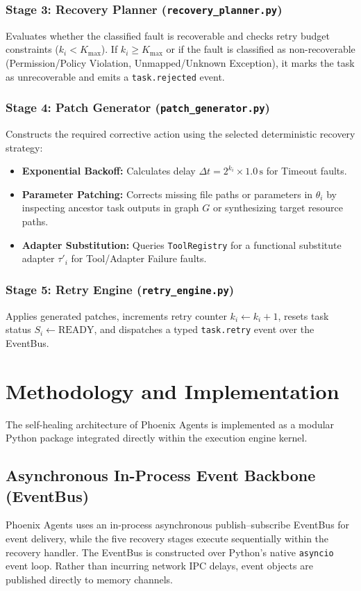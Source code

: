 \documentclass[conference]{IEEEtran}
\begin{document}
\subsubsection{Stage 3: Recovery Planner (\texttt{recovery\_planner.py})}
Evaluates whether the classified fault is recoverable and checks retry budget constraints ($k_i < K_{\text{max}}$). If $k_i \ge K_{\text{max}}$ or if the fault is classified as non-recoverable (Permission/Policy Violation, Unmapped/Unknown Exception), it marks the task as unrecoverable and emits a \texttt{task.rejected} event.

\subsubsection{Stage 4: Patch Generator (\texttt{patch\_generator.py})}
Constructs the required corrective action using the selected deterministic recovery strategy:
\begin{itemize}
    \item \textbf{Exponential Backoff:} Calculates delay $\Delta t = 2^{k_i} \times 1.0\,\text{s}$ for Timeout faults.
    \item \textbf{Parameter Patching:} Corrects missing file paths or parameters in $\theta_i$ by inspecting ancestor task outputs in graph $G$ or synthesizing target resource paths.
    \item \textbf{Adapter Substitution:} Queries \texttt{ToolRegistry} for a functional substitute adapter $\tau'_i$ for Tool/Adapter Failure faults.
\end{itemize}

\subsubsection{Stage 5: Retry Engine (\texttt{retry\_engine.py})}
Applies generated patches, increments retry counter $k_i \leftarrow k_i + 1$, resets task status $S_i \leftarrow \text{READY}$, and dispatches a typed \texttt{task.retry} event over the EventBus.

\section{Methodology and Implementation}
The self-healing architecture of Phoenix Agents is implemented as a modular Python package integrated directly within the execution engine kernel.

\subsection{Asynchronous In-Process Event Backbone (EventBus)}
Phoenix Agents uses an in-process asynchronous publish--subscribe EventBus for event delivery, while the five recovery stages execute sequentially within the recovery handler. The EventBus is constructed over Python's native \texttt{asyncio} event loop. Rather than incurring network IPC delays, event objects are published directly to memory channels.
\end{document}
